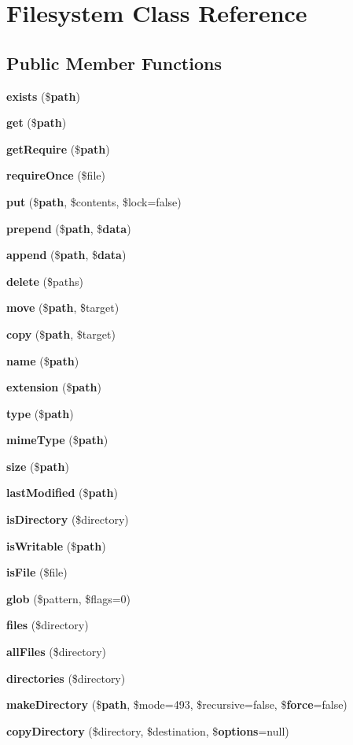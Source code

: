 \section{Filesystem Class Reference}
\label{class_illuminate_1_1_filesystem_1_1_filesystem}
\subsection*{Public Member Functions}
\begin{DoxyCompactItemize}
\item 
{\bf exists} (\${\bf path})
\item 
{\bf get} (\${\bf path})
\item 
{\bf get\+Require} (\${\bf path})
\item 
{\bf require\+Once} (\$file)
\item 
{\bf put} (\${\bf path}, \$contents, \$lock=false)
\item 
{\bf prepend} (\${\bf path}, \${\bf data})
\item 
{\bf append} (\${\bf path}, \${\bf data})
\item 
{\bf delete} (\$paths)
\item 
{\bf move} (\${\bf path}, \$target)
\item 
{\bf copy} (\${\bf path}, \$target)
\item 
{\bf name} (\${\bf path})
\item 
{\bf extension} (\${\bf path})
\item 
{\bf type} (\${\bf path})
\item 
{\bf mime\+Type} (\${\bf path})
\item 
{\bf size} (\${\bf path})
\item 
{\bf last\+Modified} (\${\bf path})
\item 
{\bf is\+Directory} (\$directory)
\item 
{\bf is\+Writable} (\${\bf path})
\item 
{\bf is\+File} (\$file)
\item 
{\bf glob} (\$pattern, \$flags=0)
\item 
{\bf files} (\$directory)
\item 
{\bf all\+Files} (\$directory)
\item 
{\bf directories} (\$directory)
\item 
{\bf make\+Directory} (\${\bf path}, \$mode=493, \$recursive=false, \${\bf force}=false)
\item 
{\bf copy\+Directory} (\$directory, \$destination, \${\bf options}=null)

\end{DoxyCompactItemize}
